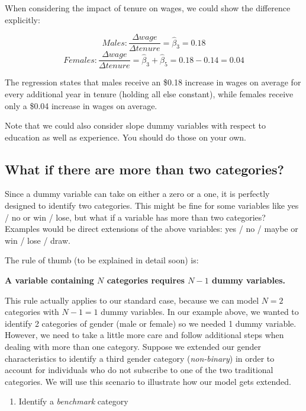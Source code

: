 \documentclass[
]{book}
\providecommand{\tightlist}{%
  \setlength{\itemsep}{0pt}\setlength{\parskip}{0pt}}
\begin{document}
When considering the impact of tenure on wages, we could show the difference explicitly:

\[Males: \frac{\Delta wage}{\Delta tenure} = \hat{\beta}_3=0.18\]
\[Females: \frac{\Delta wage}{\Delta tenure} = \hat{\beta}_3+\hat{\beta}_5=0.18-0.14=0.04\]

The regression states that males receive an \$0.18 increase in wages on average for every additional year in tenure (holding all else constant), while females receive only a \$0.04 increase in wages on average.

Note that we could also consider slope dummy variables with respect to education as well as experience. You should do those on your own.

\hypertarget{what-if-there-are-more-than-two-categories}{%
\subsection{What if there are more than two categories?}\label{what-if-there-are-more-than-two-categories}}

Since a dummy variable can take on either a zero or a one, it is perfectly designed to identify two categories. This might be fine for some variables like yes / no or win / lose, but what if a variable has more than two categories? Examples would be direct extensions of the above variables: yes / no / maybe or win / lose / draw.

The rule of thumb (to be explained in detail soon) is:

\textbf{A variable containing \(N\) categories requires \(N-1\) dummy variables.}

This rule actually applies to our standard case, because we can model \(N=2\) categories with \(N-1=1\) dummy variables. In our example above, we wanted to identify 2 categories of gender (male or female) so we needed 1 dummy variable. However, we need to take a little more care and follow additional steps when dealing with more than one category. Suppose we extended our gender characteristics to identify a third gender category (\emph{non-binary}) in order to account for individuals who do not subscribe to one of the two traditional categories. We will use this scenario to illustrate how our model gets extended.

\begin{enumerate}
\def\labelenumi{\arabic{enumi}.}
\tightlist
\item
  Identify a \emph{benchmark} category
\end{enumerate}
\end{document}
